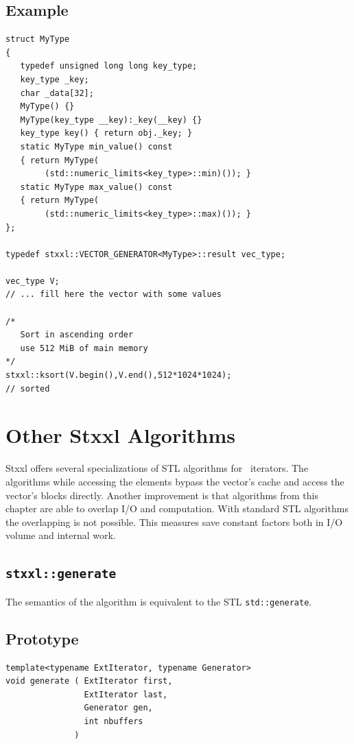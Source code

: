 \documentclass[twoside]{book}
\newcommand{\stxxl}{{\sc Stxxl} }
\begin{document}
\subsection*{Example}
\begin{lstlisting}
struct MyType
{
   typedef unsigned long long key_type;
   key_type _key;
   char _data[32];
   MyType() {}
   MyType(key_type __key):_key(__key) {}
   key_type key() { return obj._key; }
   static MyType min_value() const 
   { return MyType(
        (std::numeric_limits<key_type>::min)()); }
   static MyType max_value() const 
   { return MyType(
        (std::numeric_limits<key_type>::max)()); }
};

typedef stxxl::VECTOR_GENERATOR<MyType>::result vec_type;

vec_type V;
// ... fill here the vector with some values

/*
   Sort in ascending order
   use 512 MiB of main memory
*/
stxxl::ksort(V.begin(),V.end(),512*1024*1024);
// sorted
\end{lstlisting}



\section{Other \stxxl Algorithms}
\label{otheralgs}

\stxxl offers several specializations of STL algorithms for \xvector\ 
iterators. The algorithms while accessing the elements bypass the
vector's cache and access the vector's blocks directly. Another
improvement is that algorithms from this chapter are able to overlap
I/O and computation. With standard STL algorithms the overlapping is
not possible. 
This measures save constant factors both in I/O volume and internal
work. 
\subsection{\texttt{stxxl::generate}}
\label{stxxl::generate}
The semantics of the algorithm is equivalent to the STL
\texttt{std::generate}. 

\subsection*{Prototype}
\begin{lstlisting}
template<typename ExtIterator, typename Generator>
void generate ( ExtIterator first,
                ExtIterator last,
                Generator gen,
                int nbuffers
              ) 
\end{lstlisting}
\end{document}
